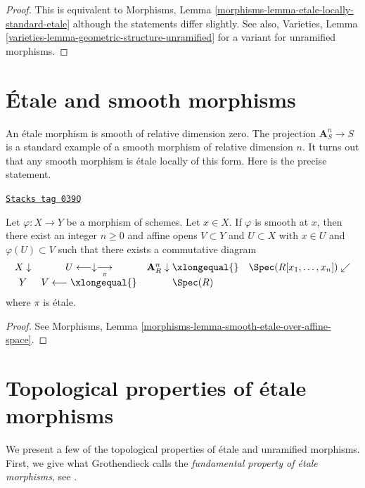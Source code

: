 \begin{proof}
This is equivalent to
Morphisms, Lemma \ref{morphisms-lemma-etale-locally-standard-etale}
although the statements differ slightly.
See also, Varieties, Lemma \ref{varieties-lemma-geometric-structure-unramified}
for a variant for unramified morphisms.
\end{proof}

\section{\'Etale and smooth morphisms}
\label{etale-section-etale-smooth}
An \'etale morphism is smooth of relative dimension zero.
The projection $\mathbf{A}^n_S \to S$ is a standard example
of a smooth morphism of relative dimension $n$.
It turns out that any smooth morphism is \'etale locally
of this form. Here is the precise statement.

\begin{theorem}
\label{etale-theorem-smooth-etale-over-n-space}
\href{https://stacks.math.columbia.edu/tag/039Q}{\texttt{Stacks tag 039Q}}

Let $\varphi : X \to Y$ be a morphism of schemes.
Let $x \in X$.
If $\varphi$ is smooth at $x$, then
there exist an integer $n \geq 0$ and affine opens
$V \subset Y$ and $U \subset X$ with $x \in U$ and $\varphi(U) \subset V$
such that there exists a commutative diagram
$$
\begin{array}{cccc}X \downarrow & U \longleftarrow\downarrow\underset{\pi}{\longrightarrow} & \mathbf{A}^n_R \downarrow\xlongequal{} & \Spec(R[x_1, \ldots, x_n]) \swarrow \\ Y & V \longleftarrow\xlongequal{} & \Spec(R) & \end{array}
$$
where $\pi$ is \'etale.
\end{theorem}

\begin{proof}
See
Morphisms, Lemma \ref{morphisms-lemma-smooth-etale-over-affine-space}.
\end{proof}

\section{Topological properties of \'etale morphisms}
\label{etale-section-topological-etale}
We present a few of the topological properties of \'etale and
unramified morphisms. First, we give what Grothendieck
calls the {\it fundamental property of \'etale morphisms}, see
\cite[Expos\'e I.5]{SGA1}.

